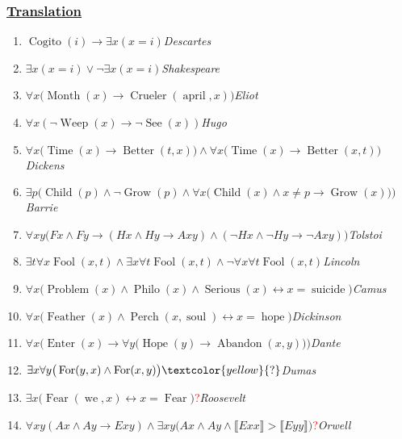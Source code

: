 \documentclass[UTF8,aspectratio=43,11pt,colorlinks,compress,openany]{beamer}%
\begin{document}
\begin{frame}\frametitle{\href{http://jdh.hamkins.org/famous-quotations-in-their-original-language/}{Translation}}
\begin{enumerate}
\item $\operatorname{Cogito}(i)\to\exists x(x=i)$\hfill \textsl{Descartes}
\item $\exists x(x=i)\vee\neg\exists x(x=i)$\hfill \textsl{Shakespeare}
\item $\forall x\big(\operatorname{Month}(x)\to\operatorname{Crueler}(\operatorname{april},x)\big)$\hfill \textsl{Eliot}
\item $\forall x(\neg\operatorname{Weep}(x)\to\neg\operatorname{See}(x))$\hfill \textsl{Hugo}
\item $\forall x\big(\operatorname{Time}(x)\to\operatorname{Better}(t,x)\big)\wedge\forall x\big(\operatorname{Time}(x)\to\operatorname{Better}(x,t)\big)$\hfill \textsl{Dickens}
\item $\exists p\Big(\operatorname{Child}(p)\wedge\neg\operatorname{Grow}(p)\wedge\forall x\big(\operatorname{Child}(x)\wedge x\ne p\to\operatorname{Grow}(x)\big)\Big)$\hfill \textsl{Barrie}
\item $\forall xy\big(Fx\wedge Fy\to (Hx\wedge Hy\to Axy)\wedge(\neg Hx\wedge\neg Hy\to\neg Axy)\big)$\hfill \textsl{Tolstoi}
\item $\exists t\forall x \operatorname{Fool}(x,t)\wedge \exists x\forall t \operatorname{Fool}(x,t)\wedge\neg\forall x\forall t \operatorname{Fool}(x,t)$\hfill \textsl{Lincoln}
\item $\forall x\big(\operatorname{Problem}(x)\wedge\operatorname{Philo}(x)\wedge\operatorname{Serious}(x)\leftrightarrow x=\operatorname{suicide}\big)$\hfill \textsl{Camus}
\item $\forall x\big(\operatorname{Feather}(x)\wedge\operatorname{Perch}(x,\operatorname{soul})\leftrightarrow x=\operatorname{hope}\big)$\hfill \textsl{Dickinson}
\item $\forall x\Big(\operatorname{Enter}(x)\to\forall y\big(\operatorname{Hope}(y)\to\operatorname{Abandon}(x,y)\big)\Big)$\hfill \textsl{Dante}
\item $\exists x\forall y\big(\operatorname{For}(y,x)\wedge\operatorname{For}(x,y)\big)\textcolor{yellow}{?}$\hfill \textsl{Dumas}
\item $\exists x\big(\operatorname{Fear}(\operatorname{we},x)\leftrightarrow x=\operatorname{Fear}\big)$\textcolor{red}{?}\hfill \textsl{Roosevelt}
\item $\forall xy(Ax\wedge Ay\to Exy)\wedge\exists xy\big(Ax\wedge Ay\wedge\llbracket Exx\rrbracket>\llbracket Eyy\rrbracket\big)$\textcolor{red}{?}\hfill \textsl{Orwell}
\end{enumerate}
\end{frame}
\end{document}
